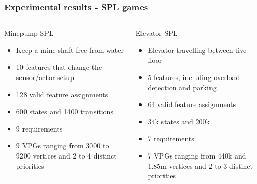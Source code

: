 \documentclass[aspectratio=169]{beamer}
\begin{document}
\begin{frame}[t]
\frametitle{Experimental results - SPL games}
\begin{columns}[T]
	\begin{column}{0.5\textwidth}
		\large Minepump SPL\\\normalsize
		\begin{itemize}
			\item Keep a mine shaft free from water
			\item 10 features that change the sensor/actor setup\pause
			\item 128 valid feature assignments
			\item 600 states and 1400 transitions
			\item 9 requirements
			\item 9 VPGs ranging from 3000 to 9200 vertices and 2 to 4 distinct priorities
		\end{itemize}
	\end{column}\pause
	\begin{column}{0.5\textwidth}
		\large Elevator SPL\\\normalsize
		\begin{itemize}
			\item Elevator travelling between five floor
			\item 5 features, including overload detection and parking\pause
			\item 64 valid feature assignments
			\item 34k states and 200k
			\item 7 requirements
			\item 7 VPGs ranging from 440k and 1.85m vertices and 2 to 3 distinct priorities
		\end{itemize}
	\end{column}
\end{columns}
\end{frame}

\end{document}
